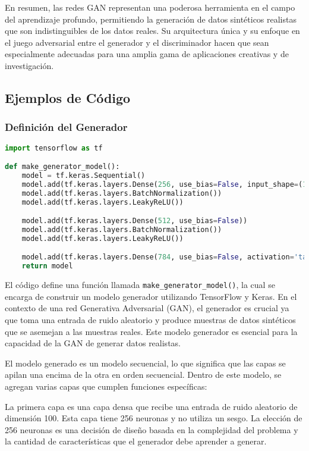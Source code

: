 En resumen, las redes GAN representan una poderosa herramienta en el campo del aprendizaje profundo, permitiendo la generación de datos sintéticos realistas que son indistinguibles de los datos reales. Su arquitectura única y su enfoque en el juego adversarial entre el generador y el discriminador hacen que sean especialmente adecuadas para una amplia gama de aplicaciones creativas y de investigación.


\subsection{Ejemplos de Código}

\subsubsection{Definición del Generador}

\begin{lstlisting}[language=Python]
import tensorflow as tf

def make_generator_model():
    model = tf.keras.Sequential()
    model.add(tf.keras.layers.Dense(256, use_bias=False, input_shape=(100,)))
    model.add(tf.keras.layers.BatchNormalization())
    model.add(tf.keras.layers.LeakyReLU())

    model.add(tf.keras.layers.Dense(512, use_bias=False))
    model.add(tf.keras.layers.BatchNormalization())
    model.add(tf.keras.layers.LeakyReLU())

    model.add(tf.keras.layers.Dense(784, use_bias=False, activation='tanh'))
    return model
\end{lstlisting}

El código define una función llamada \texttt{make\_generator\_model()}, la cual se encarga de construir un modelo generador utilizando TensorFlow y Keras. En el contexto de una red Generativa Adversarial (GAN), el generador es crucial ya que toma una entrada de ruido aleatorio y produce muestras de datos sintéticos que se asemejan a las muestras reales. Este modelo generador es esencial para la capacidad de la GAN de generar datos realistas.

El modelo generado es un modelo secuencial, lo que significa que las capas se apilan una encima de la otra en orden secuencial. Dentro de este modelo, se agregan varias capas que cumplen funciones específicas:

La primera capa es una capa densa que recibe una entrada de ruido aleatorio de dimensión 100. Esta capa tiene 256 neuronas y no utiliza un sesgo. La elección de 256 neuronas es una decisión de diseño basada en la complejidad del problema y la cantidad de características que el generador debe aprender a generar.

